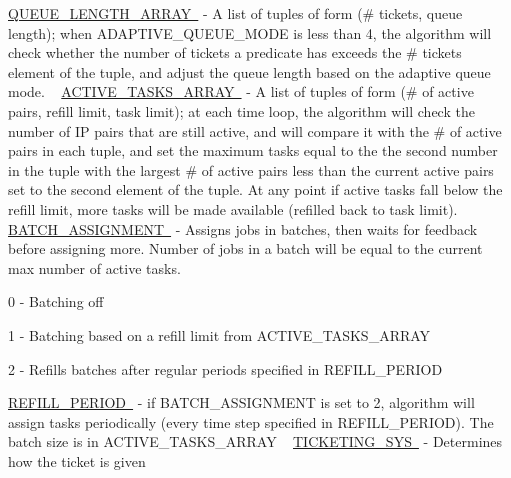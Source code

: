 \mbox{\hyperlink{namespacedynamicfilterapp_1_1toggles_af8d4fe75258dd9f8b4c8cdb1b5b68ad1}{Q\+U\+E\+U\+E\+\_\+\+L\+E\+N\+G\+T\+H\+\_\+\+A\+R\+R\+AY }} -\/ A list of tuples of form (\# tickets, queue length); when A\+D\+A\+P\+T\+I\+V\+E\+\_\+\+Q\+U\+E\+U\+E\+\_\+\+M\+O\+DE is less than 4, the algorithm will check whether the number of tickets a predicate has exceeds the \# tickets element of the tuple, and adjust the queue length based on the adaptive queue mode. ~\newline
 \mbox{\hyperlink{namespacedynamicfilterapp_1_1toggles_a8f7b1e7beea29c74a7defab7d44ef294}{A\+C\+T\+I\+V\+E\+\_\+\+T\+A\+S\+K\+S\+\_\+\+A\+R\+R\+AY }} -\/ A list of tuples of form (\# of active pairs, refill limit, task limit); at each time loop, the algorithm will check the number of IP pairs that are still active, and will compare it with the \# of active pairs in each tuple, and set the maximum tasks equal to the the second number in the tuple with the largest \# of active pairs less than the current active pairs set to the second element of the tuple. At any point if active tasks fall below the refill limit, more tasks will be made available (refilled back to task limit). ~\newline
 \mbox{\hyperlink{namespacedynamicfilterapp_1_1toggles_ab1f6b66c3fc1afbd280b14695b54f33f}{B\+A\+T\+C\+H\+\_\+\+A\+S\+S\+I\+G\+N\+M\+E\+NT }} -\/ Assigns jobs in batches, then waits for feedback before assigning more. Number of jobs in a batch will be equal to the current max number of active tasks.
\begin{DoxyItemize}
\item 0 -\/ Batching off
\item 1 -\/ Batching based on a refill limit from A\+C\+T\+I\+V\+E\+\_\+\+T\+A\+S\+K\+S\+\_\+\+A\+R\+R\+AY
\item 2 -\/ Refills batches after regular periods specified in R\+E\+F\+I\+L\+L\+\_\+\+P\+E\+R\+I\+OD
\end{DoxyItemize}

\mbox{\hyperlink{namespacedynamicfilterapp_1_1toggles_a26c4f956b0a9438426925bee66b89a2b}{R\+E\+F\+I\+L\+L\+\_\+\+P\+E\+R\+I\+OD }} -\/ if B\+A\+T\+C\+H\+\_\+\+A\+S\+S\+I\+G\+N\+M\+E\+NT is set to 2, algorithm will assign tasks periodically (every time step specified in R\+E\+F\+I\+L\+L\+\_\+\+P\+E\+R\+I\+OD). The batch size is in A\+C\+T\+I\+V\+E\+\_\+\+T\+A\+S\+K\+S\+\_\+\+A\+R\+R\+AY ~\newline
 \mbox{\hyperlink{namespacedynamicfilterapp_1_1toggles_a4efd3667e6643a4cd2b96c4e647fa2f7}{T\+I\+C\+K\+E\+T\+I\+N\+G\+\_\+\+S\+YS }} -\/ Determines how the ticket is given ~\newline

